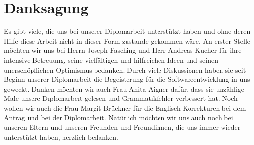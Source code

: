 %
%
\newpage

%
%
\section*{Danksagung}
Es gibt viele, die uns bei unserer Diplomarbeit unterstützt haben und ohne deren Hilfe diese Arbeit nicht in
dieser Form zustande gekommen wäre.
An erster Stelle möchten wir uns bei Herrn Joseph Fasching und Herr Andreas Kucher für ihre intensive Betreuung, seine vielfältigen und
hilfreichen Ideen und seinen unerschöpflichen Optimismus bedanken. Durch viele Diskussionen haben sie seit
Beginn unserer Diplomarbeit die Begeisterung für die Softwareentwicklung in uns geweckt.
Danken möchten wir auch Frau Anita Aigner dafür, dass sie unzählige Male unsere Diplomarbeit gelesen
und Grammatikfehler verbessert hat. Noch wollen wir auch die Frau Margit Brückner für die Englisch Korrekturen bei
dem Antrag und bei der Diplomarbeit.
Natürlich möchten wir uns auch noch bei unseren Eltern und unseren Freunden und Freundinnen, die uns
immer wieder unterstützt haben, herzlich bedanken.

\vspace{4cm}

